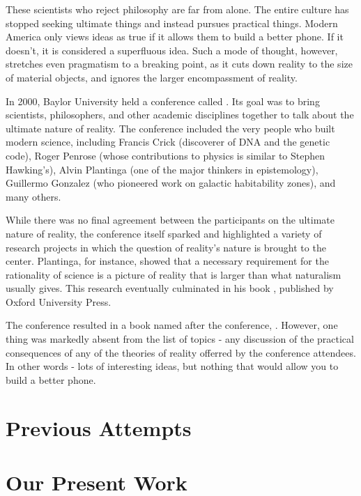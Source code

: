 These scientists who reject philosophy are far from alone.  The entire culture has stopped seeking ultimate things and instead pursues practical things.  Modern America only views ideas as true if it allows them to build a better phone.  If it doesn't, it is considered a superfluous idea.  Such a mode of thought, however, stretches even pragmatism to a breaking point, as it cuts down reality to the size of material objects, and ignores the larger encompassment of reality.

In 2000, Baylor University held a conference called .  Its goal was to bring scientists, philosophers, and other academic disciplines together to talk about the ultimate nature of reality.  The conference included the very people who built modern science, including Francis Crick (discoverer of DNA and the genetic code), Roger Penrose (whose contributions to physics is similar to Stephen Hawking's), Alvin Plantinga (one of the major thinkers in epistemology), Guillermo Gonzalez (who pioneered work on galactic habitability zones), and many others.  

While there was no final agreement between the participants on the ultimate nature of reality, the conference itself sparked and highlighted a variety of research projects in which the question of reality's nature is brought to the center.  Plantinga, for instance, showed that a necessary requirement for the rationality of science is a picture of reality that is larger than what naturalism usually gives.  This research eventually culminated in his book , published by Oxford University Press.  

The conference resulted in a book named after the conference, .  However, one thing was markedly absent from the list of topics - any discussion of the practical consequences of any of the theories of reality offerred by the conference attendees.  In other words - lots of interesting ideas, but nothing that would allow you to build a better phone.

\section{Previous Attempts}


\section{Our Present Work}


